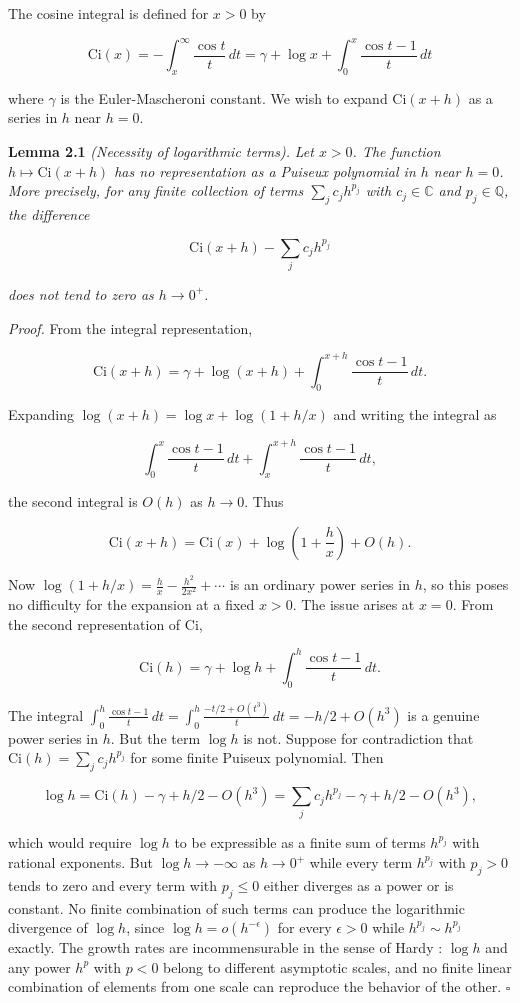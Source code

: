 \documentclass[12pt]{article}
\begin{document}
The cosine integral is defined for \(x > 0\) by

\[\mathrm{Ci}(x) = -\int_x^\infty \frac{\cos t}{t}\,dt = \gamma + \log x + \int_0^x \frac{\cos t - 1}{t}\,dt\]

where \(\gamma\) is the Euler-Mascheroni constant. We wish to expand
\(\mathrm{Ci}(x + h)\) as a series in \(h\) near \(h = 0\).

\textbf{Lemma 2.1} \emph{(Necessity of logarithmic terms).} \emph{Let
\(x > 0\). The function \(h \mapsto \mathrm{Ci}(x+h)\) has no
representation as a Puiseux polynomial in \(h\) near \(h = 0\). More
precisely, for any finite collection of terms \(\sum_j c_j h^{p_j}\)
with \(c_j \in \mathbb{C}\) and \(p_j \in \mathbb{Q}\), the difference}

\[\mathrm{Ci}(x+h) - \sum_j c_j h^{p_j}\]

\emph{does not tend to zero as \(h \to 0^+\).}

\emph{Proof.} From the integral representation,

\[\mathrm{Ci}(x+h) = \gamma + \log(x+h) + \int_0^{x+h} \frac{\cos t - 1}{t}\,dt.\]

Expanding \(\log(x+h) = \log x + \log(1 + h/x)\) and writing the
integral as

\[\int_0^x \frac{\cos t - 1}{t}\,dt + \int_x^{x+h} \frac{\cos t - 1}{t}\,dt,\]

the second integral is \(O(h)\) as \(h \to 0\). Thus

\[\mathrm{Ci}(x+h) = \mathrm{Ci}(x) + \log\!\left(1 + \frac{h}{x}\right) + O(h).\]

Now \(\log(1 + h/x) = \frac{h}{x} - \frac{h^2}{2x^2} + \cdots\) is an
ordinary power series in \(h\), so this poses no difficulty for the
expansion at a fixed \(x > 0\). The issue arises at \(x = 0\). From the
second representation of \(\mathrm{Ci}\),

\[\mathrm{Ci}(h) = \gamma + \log h + \int_0^h \frac{\cos t - 1}{t}\,dt.\]

The integral
\(\int_0^h \frac{\cos t - 1}{t}\,dt = \int_0^h \frac{-t/2 + O(t^3)}{t}\,dt = -h/2 + O(h^3)\)
is a genuine power series in \(h\). But the term \(\log h\) is not.
Suppose for contradiction that \(\mathrm{Ci}(h) = \sum_j c_j h^{p_j}\)
for some finite Puiseux polynomial. Then

\[\log h = \mathrm{Ci}(h) - \gamma + h/2 - O(h^3) = \sum_j c_j h^{p_j} - \gamma + h/2 - O(h^3),\]

which would require \(\log h\) to be expressible as a finite sum of
terms \(h^{p_j}\) with rational exponents. But \(\log h \to -\infty\) as
\(h \to 0^+\) while every term \(h^{p_j}\) with \(p_j > 0\) tends to
zero and every term with \(p_j \leq 0\) either diverges as a power or is
constant. No finite combination of such terms can produce the
logarithmic divergence of \(\log h\), since
\(\log h = o(h^{-\epsilon})\) for every \(\epsilon > 0\) while
\(h^{p_j} \sim h^{p_j}\) exactly. The growth rates are incommensurable
in the sense of Hardy \cite{hardy1910}: \(\log h\) and any power
\(h^p\) with \(p < 0\) belong to different asymptotic scales, and no
finite linear combination of elements from one scale can reproduce the
behavior of the other.
\(\square\)
\end{document}
